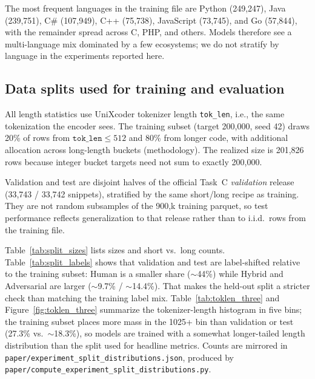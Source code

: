 \documentclass[10pt]{article}
\begin{document}
The most frequent languages in the training file are Python (249{,}247), Java (239{,}751), C\# (107{,}949), C++ (75{,}738), JavaScript (73{,}745), and Go (57{,}844), with the remainder spread across C, PHP, and others. Models therefore see a multi-language mix dominated by a few ecosystems; we do not stratify by language in the experiments reported here.

\subsection{Data splits used for training and evaluation}
\label{sec:split_stats}
All length statistics use UniXcoder tokenizer length \texttt{tok\_len}, i.e., the same tokenization the encoder sees. The training subset (target 200{,}000, seed 42) draws 20\% of rows from $\texttt{tok\_len}\leq 512$ and 80\% from longer code, with additional allocation across long-length buckets (methodology). The realized size is 201{,}826 rows because integer bucket targets need not sum to exactly 200{,}000.

Validation and test are disjoint halves of the official Task~C \emph{validation} release (33{,}743 / 33{,}742 snippets), stratified by the same short/long recipe as training. They are not random subsamples of the 900{,}k training parquet, so test performance reflects generalization to that release rather than to i.i.d.\ rows from the training file.

Table~\ref{tab:split_sizes} lists sizes and short vs.\ long counts. Table~\ref{tab:split_labels} shows that validation and test are label-shifted relative to the training subset: Human is a smaller share ($\sim$44\%) while Hybrid and Adversarial are larger ($\sim$9.7\% / $\sim$14.4\%). That makes the held-out split a stricter check than matching the training label mix. Table~\ref{tab:toklen_three} and Figure~\ref{fig:toklen_three} summarize the tokenizer-length histogram in five bins; the training subset places more mass in the 1025+ bin than validation or test (27.3\% vs.\ $\sim$18.3\%), so models are trained with a somewhat longer-tailed length distribution than the split used for headline metrics. Counts are mirrored in \texttt{paper/experiment\_split\_distributions.json}, produced by \texttt{paper/compute\_experiment\_split\_distributions.py}.
\end{document}
